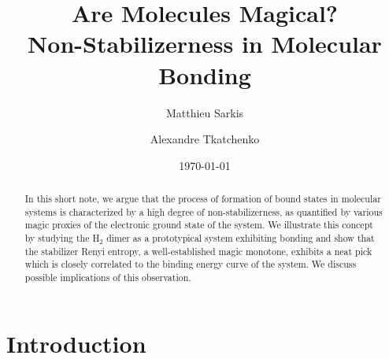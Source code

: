 \documentclass[aps, prl, twocolumn, groupedaddress, reprint, floatfix, nofootinbib, longbibliography]{revtex4-2}
\begin{document}
    \title{Are Molecules Magical?\\[0.2em]
    \small Non-Stabilizerness in Molecular Bonding}

    \author{Matthieu Sarkis}

    \author{Alexandre Tkatchenko}

    \date{\today}

\begin{abstract}
    In this short note, we argue that the process of formation of bound states in molecular systems is characterized by a high degree of non-stabilizerness, as quantified by various magic proxies of the electronic ground state of the system. We illustrate this concept by studying the H$_2$ dimer as a prototypical system exhibiting bonding and show that the stabilizer Renyi entropy, a well-established magic monotone, exhibits a neat pick which is closely correlated to the binding energy curve of the system. We discuss possible implications of this observation.
\end{abstract}

\maketitle

\section{Introduction}
\end{document}

